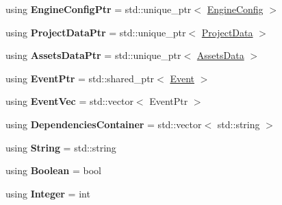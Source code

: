 \begin{DoxyCompactItemize}
\item 
\hypertarget{namespaceDCEngine_ac11900ad7484b1dc5cf052ddc3919264}{using {\bfseries Engine\-Config\-Ptr} = std\-::unique\-\_\-ptr$<$ \hyperlink{structDCEngine_1_1EngineConfig}{Engine\-Config} $>$}\label{namespaceDCEngine_ac11900ad7484b1dc5cf052ddc3919264}

\item 
\hypertarget{namespaceDCEngine_a0258cc65a1a516681ac2d51d95ae886e}{using {\bfseries Project\-Data\-Ptr} = std\-::unique\-\_\-ptr$<$ \hyperlink{structDCEngine_1_1ProjectData}{Project\-Data} $>$}\label{namespaceDCEngine_a0258cc65a1a516681ac2d51d95ae886e}

\item 
\hypertarget{namespaceDCEngine_a12e205085db7ea45f6b425edb9562a1f}{using {\bfseries Assets\-Data\-Ptr} = std\-::unique\-\_\-ptr$<$ \hyperlink{structDCEngine_1_1AssetsData}{Assets\-Data} $>$}\label{namespaceDCEngine_a12e205085db7ea45f6b425edb9562a1f}

\item 
\hypertarget{namespaceDCEngine_a2f893e17483e3faed67f5705ce6c2158}{using {\bfseries Event\-Ptr} = std\-::shared\-\_\-ptr$<$ \hyperlink{classDCEngine_1_1Event}{Event} $>$}\label{namespaceDCEngine_a2f893e17483e3faed67f5705ce6c2158}

\item 
\hypertarget{namespaceDCEngine_a6e1d160a641b4328c8105ce0265e2d7d}{using {\bfseries Event\-Vec} = std\-::vector$<$ Event\-Ptr $>$}\label{namespaceDCEngine_a6e1d160a641b4328c8105ce0265e2d7d}

\item 
\hypertarget{namespaceDCEngine_a296ff859cad2cc4039d29c128d83d64a}{using {\bfseries Dependencies\-Container} = std\-::vector$<$ std\-::string $>$}\label{namespaceDCEngine_a296ff859cad2cc4039d29c128d83d64a}

\item 
\hypertarget{namespaceDCEngine_a19eb2c9748fb95ede3cb4d48e64ba3f7}{using {\bfseries String} = std\-::string}\label{namespaceDCEngine_a19eb2c9748fb95ede3cb4d48e64ba3f7}

\item 
\hypertarget{namespaceDCEngine_aea92d510917d38732798d51238ba0068}{using {\bfseries Boolean} = bool}\label{namespaceDCEngine_aea92d510917d38732798d51238ba0068}

\item 
\hypertarget{namespaceDCEngine_ade4d197c8bc1c91df766a7774104f932}{using {\bfseries Integer} = int}\label{namespaceDCEngine_ade4d197c8bc1c91df766a7774104f932}


\end{DoxyCompactItemize}
